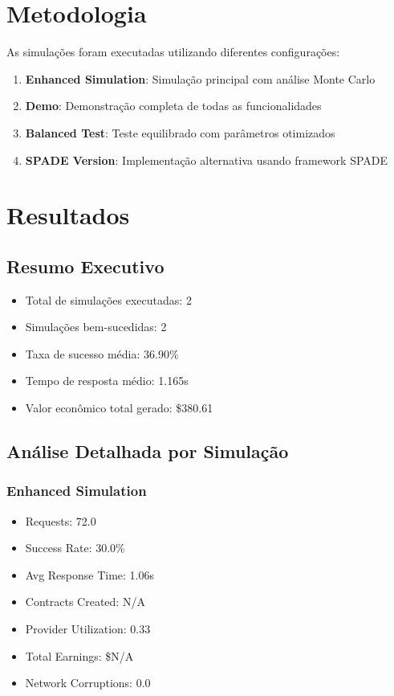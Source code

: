 \documentclass[12pt,a4paper]{article}
\begin{document}
\section{Metodologia}

As simulações foram executadas utilizando diferentes configurações:

\begin{enumerate}
    \item \textbf{Enhanced Simulation}: Simulação principal com análise Monte Carlo
    \item \textbf{Demo}: Demonstração completa de todas as funcionalidades
    \item \textbf{Balanced Test}: Teste equilibrado com parâmetros otimizados
    \item \textbf{SPADE Version}: Implementação alternativa usando framework SPADE
\end{enumerate}

\section{Resultados}

\subsection{Resumo Executivo}


\begin{itemize}
    \item Total de simulações executadas: 2
    \item Simulações bem-sucedidas: 2
    \item Taxa de sucesso média: 36.90\%
    \item Tempo de resposta médio: 1.165s
    \item Valor econômico total gerado: \$380.61
\end{itemize}


\subsection{Análise Detalhada por Simulação}


\subsubsection{Enhanced Simulation}

\begin{itemize}
    \item Requests: 72.0
    \item Success Rate: 30.0\%
    \item Avg Response Time: 1.06s
    \item Contracts Created: N/A
    \item Provider Utilization: 0.33
    \item Total Earnings: \$N/A
    \item Network Corruptions: 0.0
\end{itemize}
\end{document}
